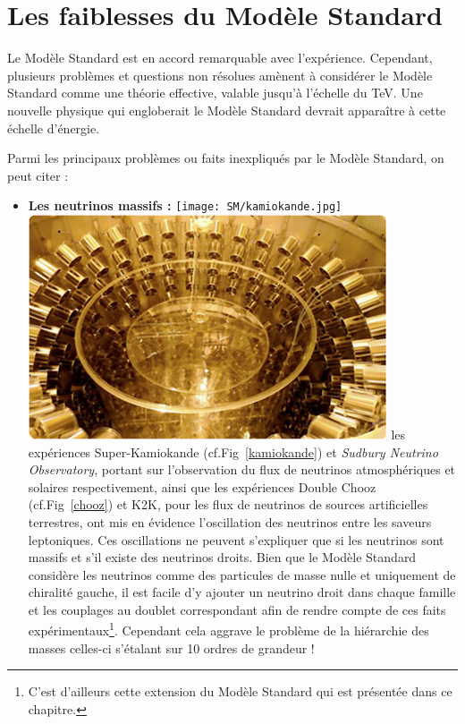 \section{Les faiblesses du Modèle Standard}
\vspace*{-0.5cm}
Le Modèle Standard est en accord remarquable avec l'expérience. Cependant, plusieurs problèmes et questions non résolues amènent à considérer le Modèle Standard comme une théorie effective, valable jusqu'à l'échelle du \si{\tera\eV}. Une nouvelle physique qui engloberait le Modèle Standard devrait apparaître à cette échelle d'énergie.

Parmi les principaux problèmes ou faits inexpliqués par le Modèle Standard, on peut citer :
\begin{itemize}[label=$\bullet$]
\item \textbf{Les neutrinos massifs :}
\marginpar
{
\centering
\texttt{[image: SM/kamiokande.jpg]}
\label{kamiokande}
}
\marginpar
{
\centering
\includegraphics[width=\marginparwidth]{SM/chooz.jpg}
\label{chooz}
} 
les expériences Super-Kamiokande (cf.Fig~\ref{kamiokande}) et \textit{Sudbury Neutrino Observatory}, portant sur l'observation du flux de neutrinos atmosphériques et solaires respectivement, ainsi que les expériences Double Chooz (cf.Fig~\ref{chooz}) et K2K, pour les flux de neutrinos de sources artificielles terrestres, ont mis en évidence l'oscillation des neutrinos entre les saveurs leptoniques. Ces oscillations ne peuvent s'expliquer que si les neutrinos sont massifs et s'il existe des neutrinos droits. Bien que le Modèle Standard considère les neutrinos comme des particules de masse nulle et uniquement de chiralité gauche, il est facile d'y ajouter un neutrino droit dans chaque famille et les couplages au doublet  correspondant afin de rendre compte de ces faits expérimentaux\footnote{C'est d'ailleurs cette extension du Modèle Standard qui est présentée dans ce chapitre.}. Cependant cela aggrave le problème de la hiérarchie des masses celles-ci s'étalant sur \num{10} ordres de grandeur !


\end{itemize}
